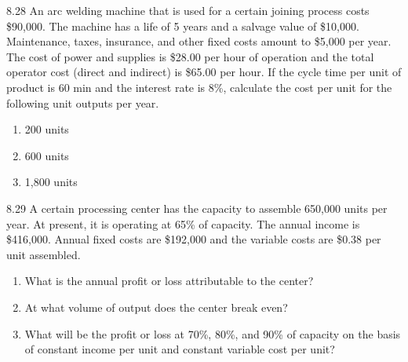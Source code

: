 \begin{exsol@solution}{}
\end{exsol@solution}
\begin{exsol@exercise}{8.28}
    \label{sea-8-28}
        An arc welding machine that is used for a certain joining process costs \$90,000. The machine has a life of 5 years and a salvage value of \$10,000. Maintenance, taxes, insurance, and other fixed costs amount to \$5,000 per year. The cost of power and supplies is \$28.00 per hour of operation and the total operator cost (direct and indirect) is \$65.00 per hour. If the cycle time per unit of product is 60 min and the interest rate is 8\%, calculate the cost per unit for the following unit outputs per year.
        \begin{enumerate}[label=\alph*)]
            \item 200 units
            \item 600 units
            \item 1,800 units
        \end{enumerate}
\end{exsol@exercise}
\begin{exsol@solution}{}
\end{exsol@solution}
\begin{exsol@exercise}{8.29}
    \label{sea-8-29}
        A certain processing center has the capacity to assemble 650,000 units per year. At present, it is operating at 65\% of capacity. The annual income is \$416,000. Annual fixed costs are \$192,000 and the variable costs are \$0.38 per unit assembled.
        \begin{enumerate}[label=\alph*)]
            \item What is the annual profit or loss attributable to the center?
            \item At what volume of output does the center break even?
            \item What will be the profit or loss at 70\%, 80\%, and 90\% of capacity on the basis of constant income per unit and constant variable cost per unit?
        \end{enumerate}
\end{exsol@exercise}
\begin{exsol@solution}{}
\end{exsol@solution}
